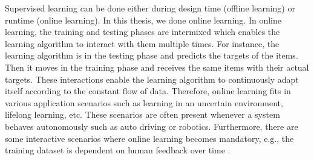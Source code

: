 \documentclass[a4paper,12pt]{article}
\begin{document}
Supervised learning can be done either during design time (offline learning) or runtime (online learning). In this thesis, we done online learning. In online learning, the training and testing phases are intermixed which enables the learning algorithm to interact with them multiple times. For instance, the learning algorithm is in the testing phase and predicts the targets of the items. Then it moves in the training phase and receives the same items with their actual targets. These interactions enable the learning algorithm to continuously adapt itself according to the constant flow of data. Therefore, online learning fits in various application scenarios such as learning in an uncertain environment, lifelong learning, etc. These scenarios are often present whenever a system behaves autonomously such as auto driving or robotics. Furthermore, there are some interactive scenarios where online learning becomes mandatory, e.g., the training dataset is dependent on human feedback over time \cite{ILAAA-2016}.
\end{document}
